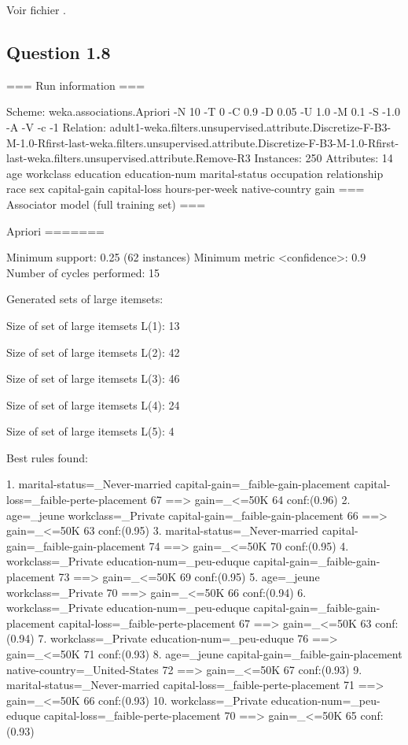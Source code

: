 \documentclass[a4paper,12pt]{article}
\begin{document}
Voir fichier .


\subsection*{Question 1.8}

=== Run information ===

Scheme:       weka.associations.Apriori -N 10 -T 0 -C 0.9 -D 0.05 -U 1.0 -M 0.1 -S -1.0 -A -V -c -1
Relation:     adult1-weka.filters.unsupervised.attribute.Discretize-F-B3-M-1.0-Rfirst-last-weka.filters.unsupervised.attribute.Discretize-F-B3-M-1.0-Rfirst-last-weka.filters.unsupervised.attribute.Remove-R3
Instances:    250
Attributes:   14
              age
               workclass
               education
               education-num
               marital-status
               occupation
               relationship
               race
               sex
               capital-gain
               capital-loss
               hours-per-week
               native-country
               gain
=== Associator model (full training set) ===


Apriori
=======

Minimum support: 0.25 (62 instances)
Minimum metric <confidence>: 0.9
Number of cycles performed: 15

Generated sets of large itemsets:

Size of set of large itemsets L(1): 13

Size of set of large itemsets L(2): 42

Size of set of large itemsets L(3): 46

Size of set of large itemsets L(4): 24

Size of set of large itemsets L(5): 4

Best rules found:

 1.  marital-status=_Never-married  capital-gain=_faible-gain-placement  capital-loss=_faible-perte-placement 67 ==>  gain=_<=50K 64    conf:(0.96)
 2. age=_jeune  workclass=_Private  capital-gain=_faible-gain-placement 66 ==>  gain=_<=50K 63    conf:(0.95)
 3.  marital-status=_Never-married  capital-gain=_faible-gain-placement 74 ==>  gain=_<=50K 70    conf:(0.95)
 4.  workclass=_Private  education-num=_peu-eduque  capital-gain=_faible-gain-placement 73 ==>  gain=_<=50K 69    conf:(0.95)
 5. age=_jeune  workclass=_Private 70 ==>  gain=_<=50K 66    conf:(0.94)
 6.  workclass=_Private  education-num=_peu-eduque  capital-gain=_faible-gain-placement  capital-loss=_faible-perte-placement 67 ==>  gain=_<=50K 63    conf:(0.94)
 7.  workclass=_Private  education-num=_peu-eduque 76 ==>  gain=_<=50K 71    conf:(0.93)
 8. age=_jeune  capital-gain=_faible-gain-placement  native-country=_United-States 72 ==>  gain=_<=50K 67    conf:(0.93)
 9.  marital-status=_Never-married  capital-loss=_faible-perte-placement 71 ==>  gain=_<=50K 66    conf:(0.93)
10.  workclass=_Private  education-num=_peu-eduque  capital-loss=_faible-perte-placement 70 ==>  gain=_<=50K 65    conf:(0.93)
\end{document}
